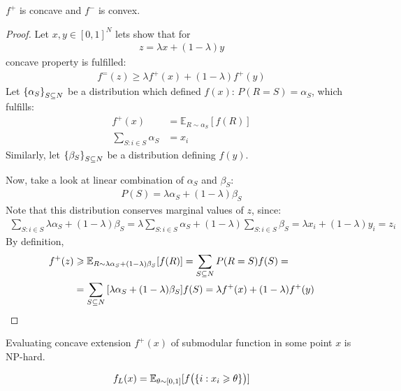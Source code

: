 \begin{prop}
	$f^+$ is concave and $f^-$ is convex.
	\begin{proof}
		Let $x,y\in [0,1]^N$ lets show that for
		\begin{align}
			z = \lambda x + (1-\lambda)y
		\end{align}
		concave property is fulfilled:
		\begin{align}
		f^=(z) \geqslant \lambda f^+(x) +  (1-\lambda)f^+(y) 
		\end{align}
		Let $\qty{\alpha_S}_{S\subseteq N}$ be a distribution which defined $f(x)$: $P(R = S) = \alpha_S$, which fulfills:
		\begin{align}
		f^+(x) &= \mathbb{E}_{R\sim \alpha_S} [f(R)] \\
		\sum_{S: i\in S} \alpha_S &= x_i
		\end{align}
		Similarly, let $\qty{\beta_S}_{S\subseteq N}$ be a distribution defining $f(y)$.
		
		Now, take a look at linear combination of $\alpha_S$ and $\beta_S$:
		\begin{align}
		P(S) = \lambda\alpha_S + (1-\lambda)\beta_S
		\end{align}
		Note that this distribution conserves marginal values of $z$, since:
		\begin{align}
		\sum_{S: i\in S} \lambda \alpha_S + (1-\lambda) \beta_S = \lambda \sum_{S: i\in S} \alpha_S + (1-\lambda) \sum_{S: i\in S}\beta_S = \lambda x_i + (1-\lambda) y_i = z_i
		\end{align} 
		By definition,
		\begin{align}
		f^+(z) &\geqslant  \mathbb{E}_{R\sim\lambda \alpha_S + (1-\lambda) \beta_S} [f(R)] = \sum_{S \subseteq N} P(R=S) f(S) =\\&= \sum_{S \subseteq N} \qty[\lambda \alpha_S + (1-\lambda) \beta_S]f(S) = \lambda f^+(x) + (1-\lambda) f^+(y)
		\end{align}
	\end{proof}
\end{prop}

\begin{prop}
	Evaluating concave extension $f^+(x)$ of submodular function in some point $x$ is NP-hard.
\end{prop}

\begin{definition}
	\begin{align}
	f_L(x) = \mathbb{E}_{\theta \sim [0,1]} [f\qty\big(\qty{i: x_i \geqslant \theta})]
	\end{align}
\end{definition}

